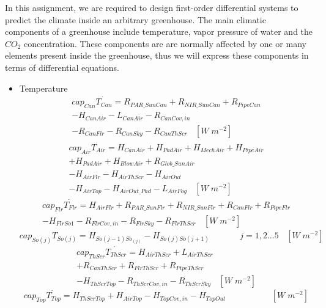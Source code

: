 \documentclass[a4paper]{article}
\begin{document}
In this assignment, we are required to design first-order differential systems to predict the climate inside an arbitrary greenhouse.
The main climatic components of a greenhouse include temperature, vapor pressure of water and the \(CO_2\) concentration.
These components are are normally affected by one or many elements present inside the greenhouse, thus we will express these components in terms of differential equations.
\begin{itemize}
  \item Temperature
        \begin{multline}
          cap_{Can}\dot{T_{Can}} = {}R_{PAR\_SunCan} + R_{NIR\_SunCan} + R_{PipeCan} \\
          - H_{CanAir} - L_{CanAir} - R_{CanCov,in} \\
          - R_{CanFlr} - R_{CanSky} - R_{CanThScr} ~~~~ [W\;m^{-2}]
        \end{multline}
        \begin{multline}
          cap_{Air}\dot{T_{Air}} = H_{CanAir} + H_{PadAir} + H_{MechAir} + H_{PipeAir} \\
          + H_{PadAir} + H_{BlowAir} + R_{Glob\_SunAir} \\
          - H_{AirFlr} - H_{AirThScr} - H_{AirOut} \\
          - H_{AirTop} - H_{AirOut\_Pad} - L_{AirFog} ~~~~ [W\;m^{-2}]
        \end{multline}
        \begin{multline}
          cap_{Flr}\dot{T_{Flr}} = H_{AirFlr} + R_{PAR\_SunFlr} + R_{NIR\_SunFlr} + R_{CanFlr} + R_{PipeFlr} \\
          - H_{FlrSo1} - R_{FlrCov,in} - R_{FlrSky} - R_{FlrThScr} ~~~~ [W\;m^{-2}]
        \end{multline}
        \begin{equation}
          cap_{So(j)}T_{So(j)} = H_{So(j-1)So_{(j)}} - H_{So(j)So(j+1)} ~~~~~~~~~~~~~~~~ j=1,2\dots5 ~~~~ [W\;m^{-2}]
        \end{equation}
        \begin{multline}
          cap_{ThScr}\dot{T_{ThScr}} = H_{AirThScr} + L_{AirThScr} \\
          + R_{CanThScr} + R_{FlrThScr} + R_{PipeThScr} \\
          - H_{ThScrTop} - R_{ThScrCov,in} - R_{ThScrSky} ~~~~ [W\;m^{-2}]
        \end{multline}
        \begin{equation}
          cap_{Top}\dot{T_{Top}} = H_{ThScrTop} + H_{AirTop} - H_{TopCov,in} - H_{TopOut} ~~~~~~~~~~~~~~~~~~~~~~~~ [W\;m^{-2}]

\end{equation}
\end{itemize}
\end{document}
